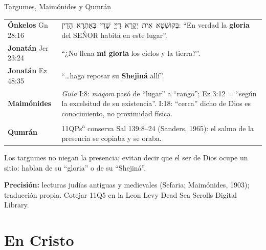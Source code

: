 \documentclass[hyperref={bookmarks=false},aspectratio=169]{beamer}
\newcommand{\heb}[1]{\mbox{\foreignlanguage{hebrew}{#1}}}
\newcommand{\SENOR}{S{\fontsize{0.78em}{1em}\selectfont EÑOR}}
\newcommand{\destacar}[1]{\textbf{\textcolor{azul}{#1}}}
\newcommand{\precision}[1]{{\footnotesize\color{gris}\textbf{Precisión:} #1}}
\begin{document}
\begin{frame}{Targumes, Maimónides y Qumrán}
\scriptsize\renewcommand{\arraystretch}{1.15}
\begin{tabular}{@{}>{\RaggedRight\arraybackslash}p{2.4cm}>{\RaggedRight\arraybackslash}p{9.4cm}@{}}
\toprule
\textbf{Ónkelos} Gn 28:16 & \heb{בְּקוּשְׁטָא אִית יְקָרָא דַיְיָ שָׁרֵי בְּאַתְרָא הָדֵין}: ``En verdad la \destacar{gloria} del \SENOR{} habita en este lugar''. \\
\textbf{Jonatán} Jer 23:24 & ``¿No llena \destacar{mi gloria} los cielos y la tierra?''. \\
\textbf{Jonatán} Ez 48:35 & ``\ldots haga reposar su \destacar{Shejiná} allí''. \\
\textbf{Maimónides} & \emph{Guía} I:8: \emph{maqom} pasó de ``lugar'' a ``rango''; Ez 3:12 = ``según la excelsitud de su existencia''. I:18: ``cerca'' dicho de Dios es conocimiento, no proximidad física. \\
\textbf{Qumrán} & 11QPs\textsuperscript{a} conserva Sal 139:8--24 (Sanders, 1965): el salmo de la presencia se copiaba y se oraba. \\
\bottomrule
\end{tabular}\par\medskip
\small\RaggedRight Los targumes no niegan la presencia; evitan decir que el ser de Dios ocupe un sitio: hablan de su ``gloria'' o de su ``Shejiná''.\par\smallskip
\precision{lecturas judías antiguas y medievales (Sefaria; Maimónides, 1903); traducción propia. Cotejar 11Q5 en la Leon Levy Dead Sea Scrolls Digital Library.}
\end{frame}

\section{En Cristo}
\end{document}
